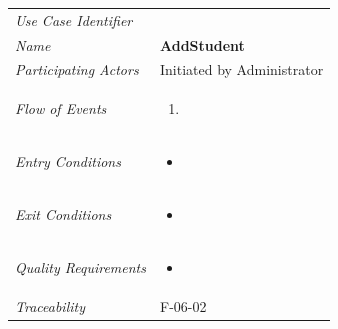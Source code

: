 \documentclass[12pt,letterpaper]{article}
\begin{document}
\begin{center}
	\begin{tabu} to 
		\toprule
		Use Case Identifier & \addstudent{} \\
		Name & {\bf AddStudent} \\
		Participating Actors & Initiated by Administrator \\
		Flow of Events & 
	    \begin{enumerate}[topsep=-1em,leftmargin=*]
		    \item 
		\end{enumerate} \\

		Entry Conditions &
		\begin{itemize}[topsep=-1em,leftmargin=*]
		    \item 
        \end{itemize} \\

		Exit Conditions &
		\begin{itemize}[topsep=-1em,leftmargin=*]
		    \item 
        \end{itemize} \\

		Quality Requirements &
		\begin{itemize}[topsep=-1em,leftmargin=*]
		    \item 
        \end{itemize} \\

		Traceability & F-06-02 \\
		\toprule
	\end{tabu}
\end{center}
\end{document}
